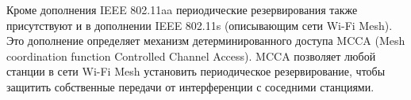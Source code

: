 
Кроме дополнения IEEE 802.11aa периодические резервирования также присутствуют и в дополнении IEEE 802.11s (описывающим сети Wi-Fi Mesh). Это дополнение определяет механизм детерминированного доступа MCCA (Mesh coordination function Controlled Channel Access). MCCA позволяет любой станции в сети Wi-Fi Mesh установить периодическое резервирование, чтобы защитить собственные передачи от интерференции с соседними станциями. %

